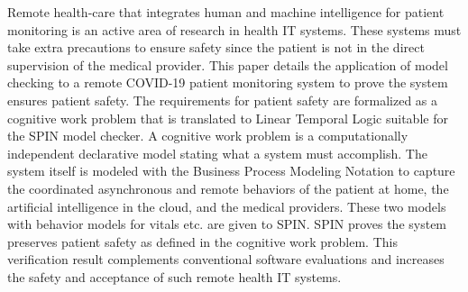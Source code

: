 Remote health-care that integrates human and machine intelligence for patient monitoring is an active area of research in health IT systems. These systems must take extra precautions to ensure safety since the patient is not in the direct supervision of the medical provider. This paper details the application of model checking to a remote COVID-19 patient monitoring system to prove the system ensures patient safety. The requirements for patient safety are formalized as a cognitive work problem that is translated to Linear Temporal Logic suitable for the SPIN model checker. A cognitive work problem is a computationally independent declarative model stating what a system must accomplish. The system itself is modeled with the Business Process Modeling Notation to capture the coordinated asynchronous and remote behaviors of the patient at home, the artificial intelligence in the cloud, and the medical providers. These two models with behavior models for vitals etc. are given to SPIN. SPIN proves the system preserves patient safety as defined in the cognitive work problem. This verification result complements conventional software evaluations and increases the safety and acceptance of such remote health IT systems.


